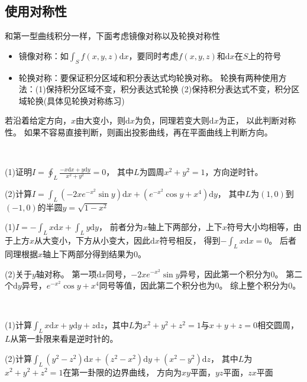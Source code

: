 \subsection{使用对称性}

和第一型曲线积分一样，下面考虑镜像对称以及轮换对称性

\begin{itemize}
\item 镜像对称：如$\int_S f(x,y,z)\mathrm{d} x$，要同时考虑$f(x,y,z)$和$\mathrm{d} x$在$S$上的符号
\item 轮换对称：要保证积分区域和积分表达式均轮换对称。
  轮换有两种使用方法：(1)保持积分区域不变，积分表达式轮换
  (2)保持积分表达式不变，积分区域轮换(具体见轮换对称练习)
\end{itemize}

\begin{theorem}
  若沿着给定方向，$x$由大变小，则$\mathrm{d} x$为负，同理若变大则$\mathrm{d} x$为正，
  以此判断对称性。
  如果不容易直接判断，则画出投影曲线，再在平面曲线上判断方向。
\end{theorem}

~

\begin{exercise}[镜像对称性]
  (1)证明$I = \oint _L \frac{-x\mathrm{d} x + y\mathrm{d} y}{x^2 + y^2} = 0$，
  其中$L$为圆周$x^2 + y^2 = 1$，方向逆时针。

  (2)计算$I = \int_L (-2xe^{-x^2} \sin y)\mathrm{d} x + (e^{-x^2} \cos y + x^4 )\mathrm{d} y$，
  其中$L$为$(1,0)$到$(-1,0)$的半圆$y = \sqrt{1 - x^2}$
\end{exercise}

\begin{solution}
  (1)$I = - \int_L x\mathrm{d} x + \int_L y\mathrm{d} y$，
  前者分为$x$轴上下两部分，上下$x$符号大小均相等，由于上方$x$从大变小，下方从小变大，因此$\mathrm{d} x$符号相反，
  得到$- \int_L x \mathrm{d} x = 0$。
  后者同理根据$x$轴上下两部分得到结果为$0$。

  (2)关于$y$轴对称。
  第一项$\mathrm{d} x$同号，$-2xe^{-x^2}\sin y$异号，因此第一个积分为$0$。
  第二个$\mathrm{d} y$异号，$e^{-x^2}\cos y + x^4$同号等值，因此第二个积分也为$0$。
  综上整个积分为$0$。
\end{solution}

~

\begin{exercise}[轮换对称性]
  (1)计算$\int_Lx\mathrm{d} x + y\mathrm{d} y + z\mathrm{d} z$，其中$L$为$x^2 + y^2 + z^2 = 1$与$x+y+z = 0$相交圆周，
  $L$从第一卦限来看是逆时针的。

  (2)计算$\int_L (y^2 - z^2)\mathrm{d} x + (z^2 - x^2)\mathrm{d} y + (x^2 - y^2)\mathrm{d} z$，
  其中$L$为$x^2 + y^2 + z^2 = 1$在第一卦限的边界曲线，
  方向为$xy$平面，$yz$平面，$zx$平面
\end{exercise}

